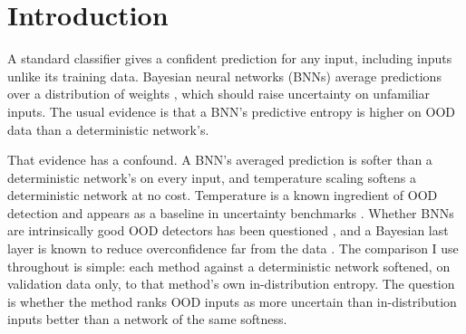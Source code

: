 \documentclass[11pt]{article}
\begin{document}
\section{Introduction}
A standard classifier gives a confident prediction for any input, including
inputs unlike its training data. Bayesian neural networks (BNNs) average
predictions over a distribution of weights \citep{blundell2015weight}, which
should raise uncertainty on unfamiliar inputs. The usual evidence is that a
BNN's predictive entropy is higher on OOD data than a deterministic network's.

That evidence has a confound. A BNN's averaged prediction is softer than a
deterministic network's on every input, and temperature scaling
\citep{guo2017calibration} softens a deterministic network at no cost.
Temperature is a known ingredient of OOD detection \citep{liang2018enhancing}
and appears as a baseline in uncertainty benchmarks \citep{ovadia2019can}.
Whether BNNs are intrinsically good OOD detectors has been questioned
\citep{henning2021bayesian}, and a Bayesian last layer is known to reduce
overconfidence far from the data \citep{kristiadi2020being}. The comparison I
use throughout is simple: each method against a deterministic network
softened, on validation data only, to that method's own in-distribution
entropy. The question is whether the method ranks OOD inputs as more
uncertain than in-distribution inputs better than a network of the same
softness.
\end{document}
